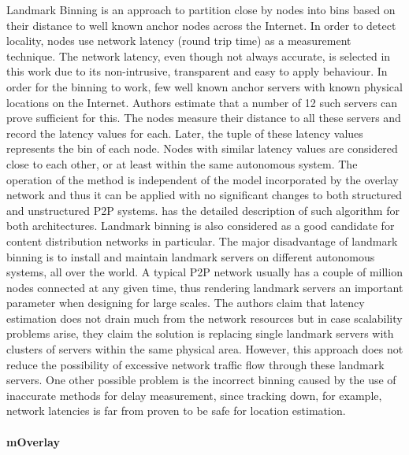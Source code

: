\documentclass[acmcsur,acmnow]{acmtrans2m}
\begin{document}
Landmark Binning \cite{ratnasamy_binning_2002} is an approach to partition close
by nodes into bins based on their distance to well known anchor nodes across the Internet. In order to detect locality, nodes use network latency (round trip
time) as a measurement technique. The network latency, even though not always
accurate, is selected in this work due to its non-intrusive, transparent and
easy to apply behaviour. In order for the binning to work, few well known anchor servers with known physical locations on the Internet. Authors estimate that a number of 12 such servers can prove sufficient for this. The nodes measure their distance to all these servers and record the latency values for each. Later, the tuple of these latency values represents the bin of each node. Nodes with similar latency values are considered close to each other, or at least within the same autonomous system. The operation of the method is independent of the model incorporated by the overlay network and thus it can be applied with no significant changes to both structured and unstructured P2P systems. \cite{ratnasamy_binning_2002} has the detailed description of such algorithm for both architectures. Landmark binning is also considered as a good candidate for content distribution networks in particular. The major disadvantage of landmark
binning is to install and maintain landmark servers on different autonomous systems, all over the world.  A typical P2P network usually has a couple of million nodes
connected at any given time, thus rendering landmark servers an important parameter when designing for large scales.  The authors claim that latency estimation does not drain
much from the network resources but in case scalability problems arise, they claim the solution is replacing single landmark servers with clusters of servers
within the same physical area. However, this approach does not reduce the
possibility of excessive network traffic flow through these landmark servers. One other
possible problem is the incorrect binning caused by the use of inaccurate methods for delay measurement, since tracking down, for example, network latencies is far from proven to be safe for location estimation.


\paragraph*{\bf mOverlay}
\end{document}
